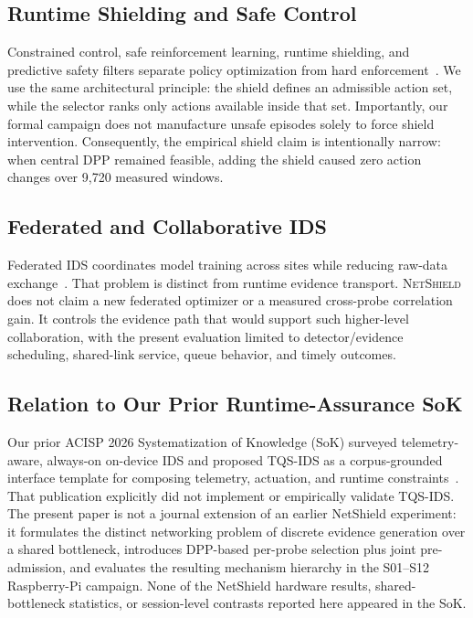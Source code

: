 \documentclass[10pt,journal]{IEEEtran}
\newcommand{\NetShield}{\textsc{NetShield}}
\begin{document}
\subsection{Runtime Shielding and Safe Control}
Constrained control, safe reinforcement learning, runtime shielding, and predictive safety filters separate policy optimization from hard enforcement~\cite{achiam2017cpo,garcia2015safe,alshiekh2018shielding,wabersich2021filter}. We use the same architectural principle: the shield defines an admissible action set, while the selector ranks only actions available inside that set. Importantly, our formal campaign does not manufacture unsafe episodes solely to force shield intervention. Consequently, the empirical shield claim is intentionally narrow: when central DPP remained feasible, adding the shield caused zero action changes over 9,720 measured windows.

\subsection{Federated and Collaborative IDS}
Federated IDS coordinates model training across sites while reducing raw-data exchange~\cite{mcmahan2017fedavg,nguyen2021fliot,li2021deepfed}. That problem is distinct from runtime evidence transport. \NetShield{} does not claim a new federated optimizer or a measured cross-probe correlation gain. It controls the evidence path that would support such higher-level collaboration, with the present evaluation limited to detector/evidence scheduling, shared-link service, queue behavior, and timely outcomes.

\subsection{Relation to Our Prior Runtime-Assurance SoK}
Our prior ACISP 2026 Systematization of Knowledge (SoK) surveyed telemetry-aware, always-on on-device IDS and proposed TQS-IDS as a corpus-grounded interface template for composing telemetry, actuation, and runtime constraints~\cite{ouyang2026sok}. That publication explicitly did not implement or empirically validate TQS-IDS. The present paper is not a journal extension of an earlier NetShield experiment: it formulates the distinct networking problem of discrete evidence generation over a shared bottleneck, introduces DPP-based per-probe selection plus joint pre-admission, and evaluates the resulting mechanism hierarchy in the S01--S12 Raspberry-Pi campaign. None of the NetShield hardware results, shared-bottleneck statistics, or session-level contrasts reported here appeared in the SoK.
\end{document}
